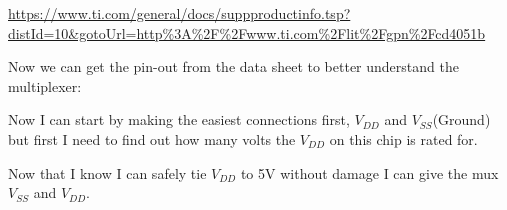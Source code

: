 \documentclass{article}
\begin{document}
\url{https://www.ti.com/general/docs/suppproductinfo.tsp?distId=10&gotoUrl=http%3A%2F%2Fwww.ti.com%2Flit%2Fgpn%2Fcd4051b}

Now we can get the pin-out from the data sheet to better understand the multiplexer:
\begin{center}
\end{center}
Now I can start by making the easiest connections first, $V_{DD}$ and $V_{SS}$(Ground) but first I need to find out how many volts the $V_{DD}$ on this chip is rated for. 
\begin{center}
\end{center}
Now that I know I can safely tie $V_{DD}$ to 5V without damage I can give the mux $V_{SS}$ and $V_{DD}.$
\end{document}
